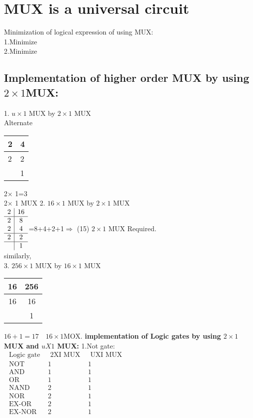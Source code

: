\section{MUX is a universal circuit}
Minimization of logical expression of using MUX:\\
1.\quad  Minimize\\
2.\quad  Minimize\\
\subsection{Implementation of higher order MUX by using $2\times 1$MUX:}
1. $u\times1$ MUX by $2\times 1$ MUX\\
Alternate\\
\begin{tabular}{p{0.5cm}|p{0.5cm}}
2&4\\\hline
2&2\\\hline
 &1
\end{tabular}
2$\times$ 1=3\\
2$\times$ 1 MUX
2. \quad $16\times 1$ MUX by $2\times 1$ MUX\\
$\begin{array}{c|c}
	2 & 16 \\
	\hline 2 & 8 \\
	2 & 4 \\
	\hline 2 & 2 \\
	\hline & 1
\end{array}$=8+4+2+1$\Rightarrow$ (15) $2 \times 1$ MUX
Required.\\
similarly,\\
3. \quad $256 \times 1$ MUX by $16 \times 1$ MUX\\
\begin{tabular}{c|c}
	16 & 256 \\
	\hline 16 & 16\\
		\hline  &1
\end{tabular}$16+1=17 \quad 16 \times 1 \mathrm{MOX} .$
\textbf{implementation of Logic gates by using $2 \times 1$ MUX and $u X 1$ MUX:}
1.\quad Not gate:\\
$\begin{array}{c|c|c}
	\text { Logic gate } & \text { 2XI MUX } & \text { UXI MUX } \\
	\hline \text { NOT } & 1 & 1 \\
	\hline \text { AND } & 1 & 1 \\
	\hline \text { OR } & 1 & 1 \\
	\hline \text { NAND } & 2 & 1\\
	\hline \text { NOR } & 2 & 1\\
	\hline \text { EX-OR } & 2 & 1\\
	\hline \text { EX-NOR } & 2 & 1\\
\end{array}$\\\\

